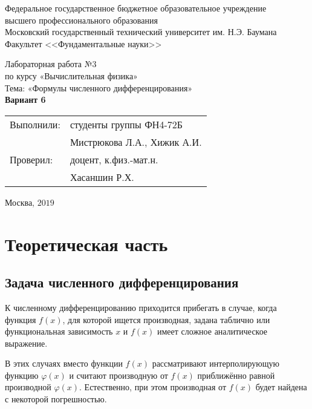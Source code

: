 \documentclass[
11pt,
master, %
subf, %
href, %
colorlinks=true, %
times, %
]{disser}
\begin{document}
	
\pagestyle{empty}
\begin{center}
	
	\noindent  Федеральное государственное бюджетное образовательное учреждение\\
	высшего профессионального образования\\
	
	Московский государственный технический университет им. Н.Э. Баумана \\
	Факультет <<Фундаментальные науки>>\bigskip\\
	
	\vfill
	
	Лабораторная работа №3\\
	по курсу «Вычислительная физика»\\
	Тема: «Формулы численного дифференцирования»\\
	\textbf{Вариант 6}\\
	
	
	\vfill
	\vfill
	\begin{flushright}
		\begin{tabular}{ll}
			Выполнили: & студенты группы ФН4-72Б     \\
			& Мистрюкова Л.А., Хижик А.И.  \\
			Проверил:  & доцент, к.физ.-мат.н.       \\
			& Хасаншин Р.Х.
		\end{tabular}
	\end{flushright}
	\vfill
	\begin{center}
		Москва, $2019$
	\end{center}
	
\end{center}
\pagebreak


\pagestyle{plain}

\tableofcontents

\section{Теоретическая часть}
\subsection{Задача численного дифференцирования}
К численному дифференцированию приходится прибегать в случае, когда функция $f(x)$, для которой ищется производная, задана таблично или функциональная зависимость $x$ и $f(x)$ имеет сложное аналитическое выражение.

В этих случаях вместо функции $f(x)$ рассматривают интерполирующую функцию $\varphi(x)$ и считают производную от $f(x)$ приближённо равной производной $\varphi(x)$. Естественно, при этом производная от $f(x)$ будет найдена с некоторой погрешностью.
\end{document}
